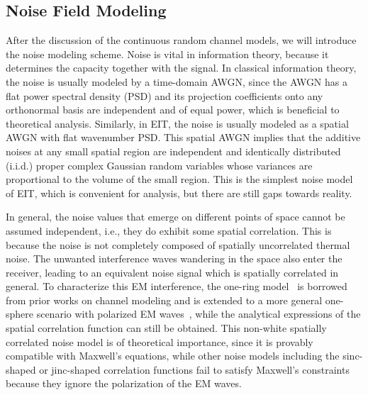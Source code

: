 \documentclass[journal,twocolumn]{IEEEtran}
\begin{document}
\subsection{Noise Field Modeling}
After the discussion of the continuous random channel models, we will introduce the noise modeling scheme. 
Noise is vital in information theory, because it determines the capacity together with the signal. 
In classical information theory, the noise is usually modeled by a time-domain AWGN, since the AWGN has a flat power spectral density (PSD) and its projection coefficients onto any orthonormal basis are independent and of equal power, which is beneficial to theoretical analysis. 
Similarly, in EIT, the noise is usually modeled as a spatial AWGN with flat wavenumber PSD. This spatial AWGN implies that the additive noises at any small spatial region are independent and identically distributed (i.i.d.) proper complex Gaussian random variables whose variances are proportional to the volume of the small region. This is the simplest noise model of EIT, which is convenient for analysis, but there are still gaps towards reality. 

In general, the noise values that emerge on different points of space cannot be assumed independent, i.e., they do exhibit some spatial correlation. 
This is because the noise is not completely composed of spatially uncorrelated thermal noise. 
The unwanted interference waves wandering in the space also enter the receiver, leading to an equivalent noise signal which is spatially correlated in general. 
To characterize this EM interference, the one-ring model~\cite{byers2004spatially} is borrowed from prior works on channel modeling and is extended to a more general one-sphere scenario with polarized EM waves~\cite{wan2022mutual}, while the analytical expressions of the spatial correlation function can still be obtained. 
This non-white spatially correlated noise model is of theoretical importance, since it is provably compatible with Maxwell's equations, while other noise models including the sinc-shaped or jinc-shaped correlation functions fail to satisfy Maxwell's constraints because they ignore the polarization of the EM waves. 
\end{document}
